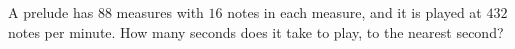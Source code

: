 A prelude has $88$ measures with $16$ notes in each measure, and it is played at $432$ notes per minute. How many seconds does it take to play, to the nearest second?
